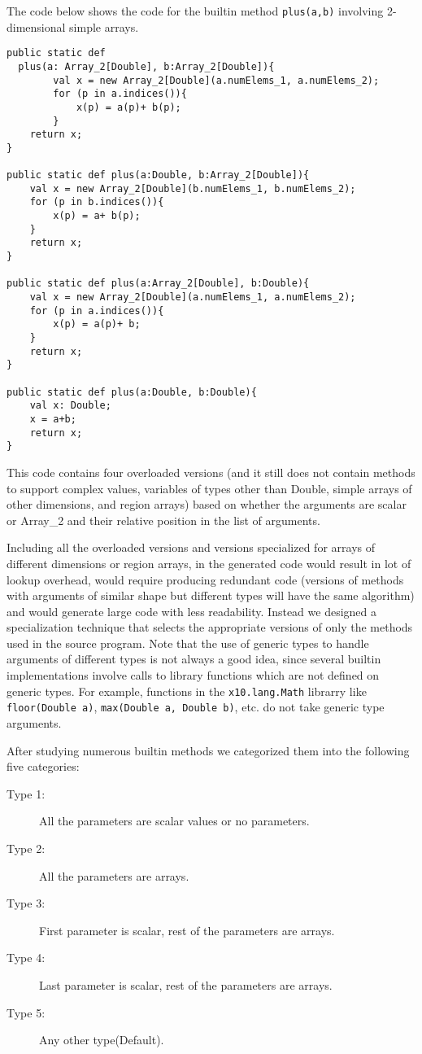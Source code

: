 The code below shows the \xten code for the \matlab builtin method
\verb|plus(a,b)| involving 2-dimensional simple arrays.

\noindent
\begin{lstlisting}[language=X10,numbers=none]
public static def 
  plus(a: Array_2[Double], b:Array_2[Double]){
		val x = new Array_2[Double](a.numElems_1, a.numElems_2);
		for (p in a.indices()){
			x(p) = a(p)+ b(p);
		}
  	return x;
}
	
public static def plus(a:Double, b:Array_2[Double]){
	val x = new Array_2[Double](b.numElems_1, b.numElems_2);
	for (p in b.indices()){
		x(p) = a+ b(p);
	}
	return x;
}
	
public static def plus(a:Array_2[Double], b:Double){
	val x = new Array_2[Double](a.numElems_1, a.numElems_2);
	for (p in a.indices()){
		x(p) = a(p)+ b;
	}
	return x;
}
	
public static def plus(a:Double, b:Double){
	val x: Double;
	x = a+b;
	return x;
}
\end{lstlisting}

This \xten code contains four overloaded versions (and it still does not
contain methods to support complex values, variables of types other than Double,
simple arrays of other dimensions, and region arrays) based 
on whether the arguments are scalar or Array\_2 and their relative position
in the list of arguments. 

Including all the overloaded versions and versions specialized for arrays of
different dimensions or region arrays, in the generated \xten code would result
in lot of lookup overhead, would require producing redundant code (versions
of methods with arguments of similar shape but different types will have the
same algorithm) and would generate large code with less readability. Instead we
designed a specialization technique that selects the appropriate versions of
only the methods used in the source \matlab program. Note that the use of
generic types to handle arguments of different types is not always a good idea,
since several builtin implementations involve calls to \xten library functions
which are not defined on generic types. For example, functions in the
\texttt{x10.lang.Math} librarry like \texttt{floor(Double a)},
\texttt{max(Double a, Double b)}, etc. do not take generic type arguments. 

After studying numerous builtin methods we categorized them into the
following five categories:

\begin{description}
\item[Type 1:] All the parameters are scalar values or no parameters.
\item[Type 2:] All the parameters are arrays.
\item[Type 3:] First parameter is scalar, rest of the parameters are arrays.
\item[Type 4:] Last parameter is scalar, rest of the parameters are arrays.
\item[Type 5:] Any other type(Default).
\end{description}

